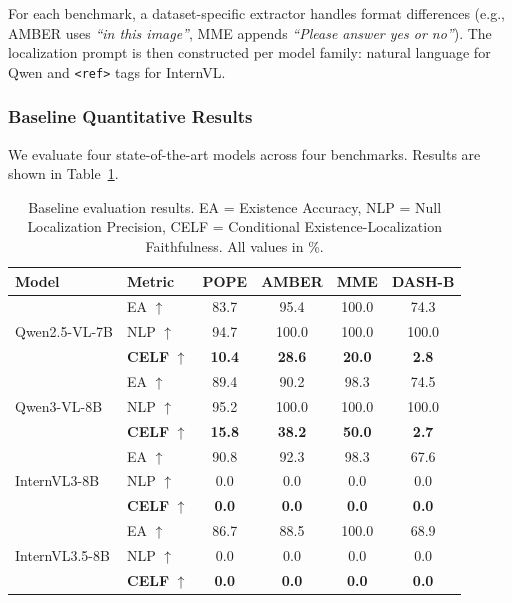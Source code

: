 \documentclass[12pt,a4paper]{article}
\begin{document}
For each benchmark, a dataset-specific extractor handles format differences (e.g., AMBER uses \textit{``in this image''}, MME appends \textit{``Please answer yes or no''}). The localization prompt is then constructed per model family: natural language for Qwen and \texttt{\textless ref\textgreater} tags for InternVL.

\subsubsection{Baseline Quantitative Results}
We evaluate four state-of-the-art models across four benchmarks. Results are shown in Table~\ref{tab:baseline}.

\begin{table}[ht]
\centering
\caption{Baseline evaluation results. EA = Existence Accuracy, NLP = Null Localization Precision, CELF = Conditional Existence-Localization Faithfulness. All values in \%.}
\label{tab:baseline}
\small
\begin{tabular}{@{}llcccc@{}}
\toprule
\textbf{Model} & \textbf{Metric} & \textbf{POPE} & \textbf{AMBER} & \textbf{MME} & \textbf{DASH-B} \\
\midrule
\multirow{3}{*}{Qwen2.5-VL-7B} & EA $\uparrow$ & 83.7 & 95.4 & 100.0 & 74.3 \\
 & NLP $\uparrow$ & 94.7 & 100.0 & 100.0 & 100.0 \\
 & \textbf{CELF} $\uparrow$ & \textbf{10.4} & \textbf{28.6} & \textbf{20.0} & \textbf{2.8} \\
\midrule
\multirow{3}{*}{Qwen3-VL-8B} & EA $\uparrow$ & 89.4 & 90.2 & 98.3 & 74.5 \\
 & NLP $\uparrow$ & 95.2 & 100.0 & 100.0 & 100.0 \\
 & \textbf{CELF} $\uparrow$ & \textbf{15.8} & \textbf{38.2} & \textbf{50.0} & \textbf{2.7} \\
\midrule
\multirow{3}{*}{InternVL3-8B} & EA $\uparrow$ & 90.8 & 92.3 & 98.3 & 67.6 \\
 & NLP $\uparrow$ & 0.0 & 0.0 & 0.0 & 0.0 \\
 & \textbf{CELF} $\uparrow$ & \textbf{0.0} & \textbf{0.0} & \textbf{0.0} & \textbf{0.0} \\
\midrule
\multirow{3}{*}{InternVL3.5-8B} & EA $\uparrow$ & 86.7 & 88.5 & 100.0 & 68.9 \\
 & NLP $\uparrow$ & 0.0 & 0.0 & 0.0 & 0.0 \\
 & \textbf{CELF} $\uparrow$ & \textbf{0.0} & \textbf{0.0} & \textbf{0.0} & \textbf{0.0} \\
\bottomrule
\end{tabular}
\end{table}
\end{document}
